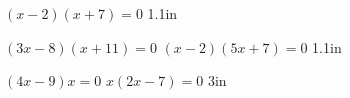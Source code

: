 {
    \centering
    $(x-2)(x+7) = 0$
}
{1.1in}

\myProblems
{
    \centering
    $(3x-8)(x+11) = 0$
}
{
    \centering
    $(x-2)(5x+7) = 0$
}
{1.1in}


\myProblems
{
    \centering
    $(4x-9)x = 0$  
}
{
    \centering
    $x(2x-7) = 0$
}
{3in}

